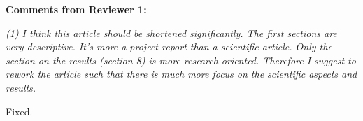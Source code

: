 \documentclass[12pt]{letter}
\begin{document}
\begin{letter}{}

{\bf Comments from Reviewer 1:}

{\em (1) I think this article should be shortened significantly. The first sections are very descriptive. It's more a project report than a scientific article. Only the section on the results (section 8) is more research oriented. Therefore I suggest to rework the article such that there is much more focus on the scientific aspects and results.}


Fixed.

\end{letter}
\end{document}
